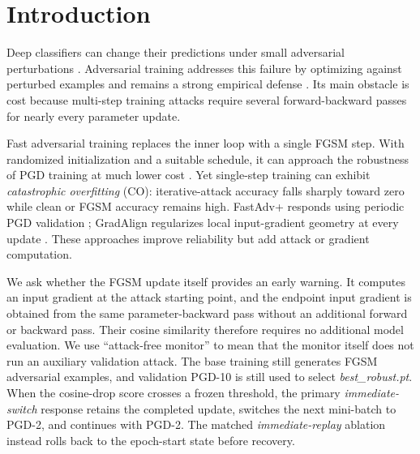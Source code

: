 \section{Introduction}
Deep classifiers can change their predictions under small adversarial
perturbations \cite{szegedy2014intriguing,goodfellow2015explaining}.
Adversarial training addresses this failure by optimizing against perturbed
examples and remains a strong empirical defense \cite{madry2018towards}. Its
main obstacle is cost because multi-step training attacks require several
forward-backward passes for nearly every parameter update.

Fast adversarial training replaces the inner loop with a single FGSM step.
With randomized initialization and a suitable schedule, it can approach the
robustness of PGD training at much lower cost \cite{wong2020fast}. Yet
single-step training can exhibit \emph{catastrophic overfitting} (CO):
iterative-attack accuracy falls sharply toward zero while clean or FGSM
accuracy remains high. FastAdv+ responds using periodic PGD validation
\cite{li2020towards}; GradAlign regularizes local input-gradient geometry at
every update \cite{andriushchenko2020understanding}. These approaches improve
reliability but add attack or gradient computation.

We ask whether the FGSM update itself provides an early warning. It computes an
input gradient at the attack starting point, and the endpoint input gradient is
obtained from the same parameter-backward pass without an additional forward or
backward pass. Their cosine similarity therefore requires no additional model
evaluation. We use ``attack-free monitor'' to mean that the monitor itself does
not run an auxiliary validation attack. The base training still generates FGSM
adversarial examples, and validation PGD-10 is still used to select
\emph{best\_robust.pt}. When the cosine-drop score crosses a frozen threshold,
the primary \emph{immediate-switch} response retains the completed update,
switches the next mini-batch to PGD-2, and continues with PGD-2. The matched
\emph{immediate-replay} ablation instead rolls back to the epoch-start state
before recovery.

